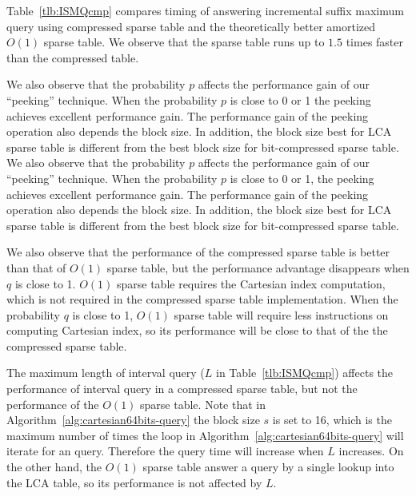 Table~\ref{tlb:ISMQcmp} compares timing of answering incremental
suffix maximum query using compressed sparse table and the
theoretically better amortized $O(1)$ sparse table.  We observe that
the sparse table runs up to $1.5$ times faster than the compressed
table.



We also observe that the probability $p$ affects the performance gain
of our ``peeking'' technique.  When the probability $p$ is close to 0
or 1 the peeking achieves excellent performance gain.  The performance
gain of the peeking operation also depends the block size.  In
addition, the block size best for LCA sparse table is different from
the best block size for bit-compressed sparse table.
We also observe that the probability $p$ affects the performance gain of
our ``peeking'' technique.  When the probability $p$ is close to 0 or 1,
the peeking achieves excellent performance gain.  The performance gain
of the peeking operation also depends the block size.  In addition, the
block size best for LCA sparse table is different from the best block
size for bit-compressed sparse table.

We also observe that the performance of the compressed sparse table is
better than that of $O(1)$ sparse table, but the performance advantage
disappears when $q$ is close to 1. $O(1)$ sparse table requires the
Cartesian index computation, which is not required in the compressed
sparse table implementation.  When the probability $q$ is close to 1,
$O(1)$ sparse table will require less instructions on computing
Cartesian index, so its performance will be close to that of the the
compressed sparse table.

The maximum length of interval query ($L$ in Table~\ref{tlb:ISMQcmp})
affects the performance of interval query in a compressed sparse
table, but not the performance of the $O(1)$ sparse table.  Note that
in Algorithm~\ref{alg:cartesian64bits-query} the block size $s$ is set
to 16, which is the maximum number of times the loop in
Algorithm~\ref{alg:cartesian64bits-query} will iterate for an query.
Therefore the query time will increase when $L$ increases.  On the
other hand, the $O(1)$ sparse table answer a query by a single lookup
into the LCA table, so its performance is not affected by $L$.




